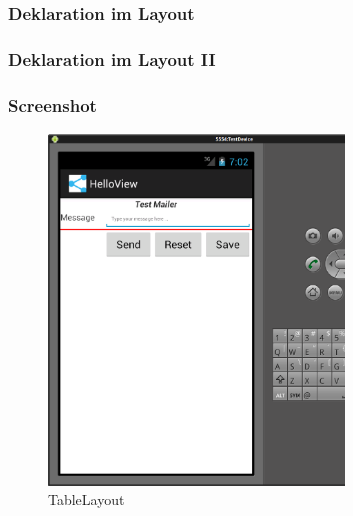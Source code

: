 \begin{frame}
   \frametitle{Deklaration im Layout}
   
\end{frame}

\begin{frame}
   \frametitle{Deklaration im Layout II}
   
\end{frame}

\begin{frame}
   \frametitle{Screenshot}
   \begin{figure}[h!]
     \centering
     \includegraphics[width=0.7\textwidth]{pictures/table_layout.ps}
     \caption{
        TableLayout
     }
     \label{fig:table_layout}
   \end{figure}
\end{frame}

